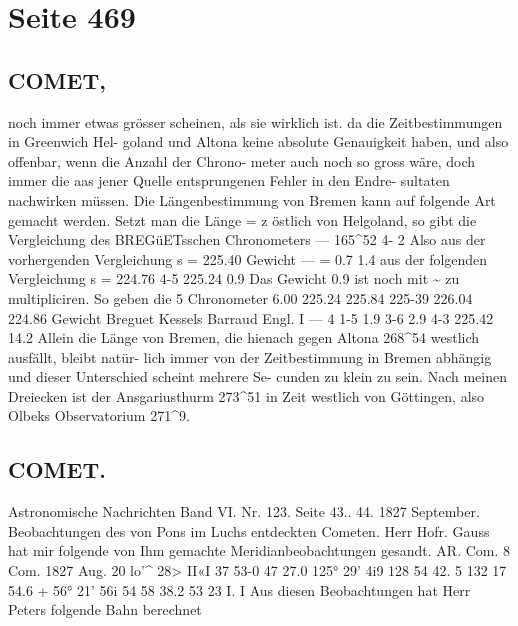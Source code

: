 \documentclass[10pt,a4paper]{article}
\begin{document}
\newpage
\section*{Seite 469}

\subsection*{COMET,}

noch  immer  etwas  grösser  scheinen,  als  sie  wirklich  ist.  da  die  Zeitbestimmungen  in  Greenwich  Hel-
goland und  Altona  keine  absolute  Genauigkeit  haben,  und  also  offenbar,  wenn  die  Anzahl  der  Chrono-
meter auch  noch  so  gross  wäre,  doch  immer  die  aas  jener  Quelle  entsprungenen  Fehler  in  den  Endre-
sultaten nachwirken  müssen.
Die  Längenbestimmung  von    Bremen   kann    auf  folgende   Art   gemacht   werden.     Setzt  man  die
Länge  =  z  östlich  von  Helgoland,  so  gibt  die  Vergleichung  des  BREGüETsschen  Chronometers
--- 165\textasciicircum{}52  4-  2
Also  aus  der  vorhergenden  Vergleichung   s  =  225.40  Gewicht  ---  =  0.7
1.4
aus  der  folgenden  Vergleichung
s  =  224.76
4-5
225.24
0.9
Das  Gewicht  0.9  ist  noch  mit  \textasciitilde{}  zu  multipliciren.     So  geben  die  5  Chronometer
6.00
225.24
225.84
225-39
226.04
224.86
Gewicht
Breguet
Kessels
Barraud
Engl.  I
---      4
1-5
1.9
3-6
2.9
4-3
225.42
14.2
Allein  die  Länge  von  Bremen,  die  hienach  gegen  Altona  268\textasciicircum{}54  westlich  ausfällt,  bleibt  natür-
lich immer  von  der  Zeitbestimmung  in  Bremen  abhängig  und  dieser  Unterschied  scheint  mehrere  Se-
cunden  zu  klein  zu  sein.  Nach  meinen  Dreiecken  ist  der  Ansgariusthurm  273\textasciicircum{}51  in  Zeit  westlich  von
Göttingen,  also  Olbeks  Observatorium  271\textasciicircum{}9.
\subsection*{COMET.}

Astronomische  Nachrichten  Band  VI.  Nr.  123.  Seite  43.. 44.     1827  September.
Beobachtungen  des  von  Pons  im  Luchs  entdeckten  Cometen.
Herr  Hofr.  Gauss  hat  mir  folgende  von  Ihm  gemachte  Meridianbeobachtungen  gesandt.
AR.  Com.
8  Com.
1827  Aug.  20
lo'\textasciicircum{}    28\glqq{}>   II«I
37     53-0
47     27.0
125°  29'    4i\glqq{}9
128     54     42. 5
132     17     54.6
+  56°  21'    56\glqq{}i
54     58     38.2
53     23       I.  I
Aus  diesen  Beobachtungen  hat  Herr  Peters  folgende  Bahn  berechnet
\end{document}
